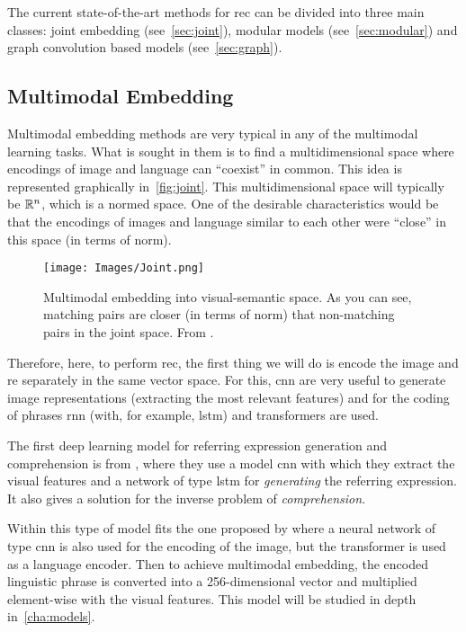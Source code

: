 The current state-of-the-art methods for \gls{rec} can be divided into three
main classes: joint embedding (see\ \vref{sec:joint}), modular models (see\
\vref{sec:modular}) and graph convolution based models (see\ \vref{sec:graph}).


\subsection{Multimodal Embedding}%
\label{sec:joint}

Multimodal embedding methods are very typical in any of the multimodal learning
tasks. What is sought in them is to find a multidimensional space where
encodings of image and language can ``coexist'' in common. This idea is
represented graphically in\ \vref{fig:joint}. This multidimensional space will
typically be \(\mathbb{R}^n\), which is a normed space. One of the desirable
characteristics would be that the encodings of images and language similar to
each other were ``close'' in this space (in terms of norm).

\begin{figure}[ht]
  \centering
  \texttt{[image: Images/Joint.png]}
  \caption[Multimodal embedding technique]{Multimodal embedding into
    visual-semantic space. As you can see, matching pairs are closer (in terms
    of norm) that non-matching pairs in the joint space. From
    .}%
  \label{fig:joint}
\end{figure}

Therefore, here, to perform \gls{rec}, the first thing we will do is encode the
image and \gls{re} separately in the same vector space. For this, \gls{cnn} are
very useful to generate image representations (extracting the most relevant
features) and for the coding of phrases \gls{rnn} (with, for example,
\gls{lstm}) and transformers are used.

The first deep learning model for referring expression generation and
comprehension is from \myCite{mao16:gener}, where they use a model \gls{cnn}
with which they extract the visual features and a network of type \gls{lstm}
for \emph{generating} the referring expression. It also gives a solution for the
inverse problem of \emph{comprehension}.

Within this type of model fits the one proposed by 
where a neural network of type \gls{cnn} is also used for the encoding of the
image, but the transformer is used as a language encoder. Then to achieve
multimodal embedding, the encoded linguistic phrase is converted into a
256-dimensional vector and multiplied element-wise with the visual
features. This model will be studied in depth in\ \vref{cha:models}.


